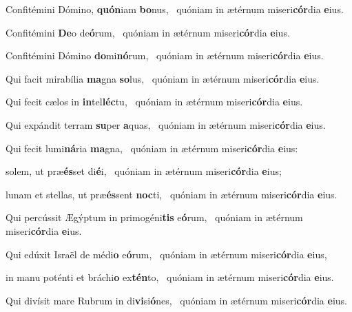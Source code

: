 \item Confitémini Dómino, \textbf{quón}iam \textbf{bo}nus,~\psstar{} quóniam in ætérnum miseri\textbf{cór}dia \textbf{e}ius.

\item Confitémini \textbf{De}o de\textbf{ó}rum,~\psstar{} quóniam in ætérnum miseri\textbf{cór}dia \textbf{e}ius.

\item Confitémini Dómino \textbf{do}mi\textbf{nó}rum,~\psstar{} quóniam in ætérnum miseri\textbf{cór}dia \textbf{e}ius.

\item Qui facit mirabília \textbf{ma}gna \textbf{so}lus,~\psstar{} quóniam in ætérnum miseri\textbf{cór}dia \textbf{e}ius.

\item Qui fecit cælos in \textbf{in}tel\textbf{léc}tu,~\psstar{} quóniam in ætérnum miseri\textbf{cór}dia \textbf{e}ius.

\item Qui expándit terram \textbf{su}per \textbf{a}quas,~\psstar{} quóniam in ætérnum miseri\textbf{cór}dia \textbf{e}ius.

\item Qui fecit lumi\textbf{ná}ria \textbf{ma}gna,~\psstar{} quóniam in ætérnum miseri\textbf{cór}dia \textbf{e}ius:

\item solem, ut præ\textbf{és}set di\textbf{é}i,~\psstar{} quóniam in ætérnum miseri\textbf{cór}dia \textbf{e}ius;

\item lunam et stellas, ut præ\textbf{és}sent \textbf{noc}ti,~\psstar{} quóniam in ætérnum miseri\textbf{cór}dia \textbf{e}ius.

\item Qui percússit Ægýptum in primogéni\textbf{tis} e\textbf{ó}rum,~\psstar{} quóniam in ætérnum miseri\textbf{cór}dia \textbf{e}ius.

\item Qui edúxit Israël de médi\textbf{o} e\textbf{ó}rum,~\psstar{} quóniam in ætérnum miseri\textbf{cór}dia \textbf{e}ius,

\item in manu poténti et bráchi\textbf{o} ex\textbf{tén}to,~\psstar{} quóniam in ætérnum miseri\textbf{cór}dia \textbf{e}ius.

\item Qui divísit mare Rubrum in di\textbf{vi}si\textbf{ó}nes,~\psstar{} quóniam in ætérnum miseri\textbf{cór}dia \textbf{e}ius.

